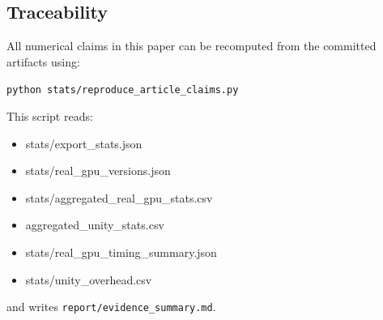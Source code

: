 \documentclass[10pt,twocolumn]{article}
\begin{document}
\subsection{Traceability}

All numerical claims in this paper can be recomputed from the committed artifacts using:
\begin{center}
\texttt{python stats/reproduce\_article\_claims.py}
\end{center}
This script reads:
\begin{itemize}[nosep,leftmargin=*,font=\small\ttfamily]
  \item stats/export\_stats.json
  \item stats/real\_gpu\_versions.json
  \item stats/aggregated\_real\_gpu\_stats.csv
  \item aggregated\_unity\_stats.csv
  \item stats/real\_gpu\_timing\_summary.json
  \item stats/unity\_overhead.csv
\end{itemize}
and writes \texttt{report/evidence\_summary.md}.
\end{document}
